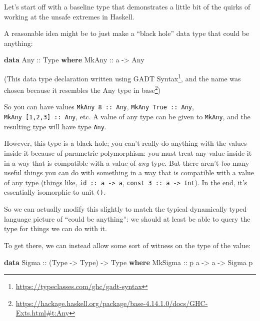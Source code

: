 \documentclass[]{article}
\newenvironment{Shaded}{}{}
\newcommand{\DataTypeTok}[1]{\textcolor[rgb]{0.56,0.13,0.00}{#1}}
\newcommand{\KeywordTok}[1]{\textcolor[rgb]{0.00,0.44,0.13}{\textbf{#1}}}
\newcommand{\NormalTok}[1]{#1}
\newcommand{\OtherTok}[1]{\textcolor[rgb]{0.00,0.44,0.13}{#1}}
\renewcommand{\href}[2]{#2\footnote{\url{#1}}}
\begin{document}
Let's start off with a baseline type that demonstrates a little bit of the
quirks of working at the unsafe extremes in Haskell.

A reasonable idea might be to just make a ``black hole'' data type that could be
anything:

\begin{Shaded}
\begin{Highlighting}[]
\KeywordTok{data} \DataTypeTok{Any}\OtherTok{ ::} \DataTypeTok{Type} \KeywordTok{where}
  \DataTypeTok{MkAny}\OtherTok{ ::}\NormalTok{ a }\OtherTok{{-}>} \DataTypeTok{Any}
\end{Highlighting}
\end{Shaded}

(This data type declaration written using
\href{https://typeclasses.com/ghc/gadt-syntax}{GADT Syntax}, and the name was
chosen because it resembles
\href{https://hackage.haskell.org/package/base-4.14.1.0/docs/GHC-Exts.html\#t:Any}{the
Any type in base})

So you can have values \texttt{MkAny\ 8\ ::\ Any},
\texttt{MkAny\ True\ ::\ Any}, \texttt{MkAny\ {[}1,2,3{]}\ ::\ Any}, etc. A
value of any type can be given to \texttt{MkAny}, and the resulting type will
have type \texttt{Any}.

However, this type is a black hole; you can't really do anything with the values
inside it because of parametric polymorphism: you must treat any value inside it
in a way that is compatible with a value of \emph{any} type. But there aren't
\emph{too} many useful things you can do with something in a way that is
compatible with a value of any type (things like,
\texttt{id\ ::\ a\ -\textgreater{}\ a},
\texttt{const\ 3\ ::\ a\ -\textgreater{}\ Int}). In the end, it's essentially
isomorphic to unit \texttt{()}.

So we can actually modify this slightly to match the typical dynamically typed
language picture of ``could be anything'': we should at least be able to query
the type for things we can do with it.

To get there, we can instead allow some sort of witness on the type of the
value:

\begin{Shaded}
\begin{Highlighting}[]
\KeywordTok{data} \DataTypeTok{Sigma}\OtherTok{ ::}\NormalTok{ (}\DataTypeTok{Type} \OtherTok{{-}>} \DataTypeTok{Type}\NormalTok{) }\OtherTok{{-}>} \DataTypeTok{Type} \KeywordTok{where}
    \DataTypeTok{MkSigma}\OtherTok{ ::}\NormalTok{ p a }\OtherTok{{-}>}\NormalTok{ a }\OtherTok{{-}>} \DataTypeTok{Sigma}\NormalTok{ p}
\end{Highlighting}
\end{Shaded}
\end{document}
